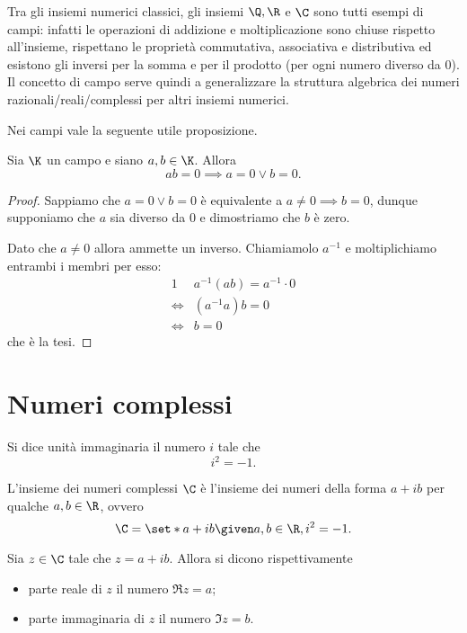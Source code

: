 Tra gli insiemi numerici classici, gli insiemi $\Q, \R$ e $\C$ sono tutti esempi di campi: infatti le operazioni di addizione e moltiplicazione sono chiuse rispetto all'insieme, rispettano le proprietà commutativa, associativa e distributiva ed esistono gli inversi per la somma e per il prodotto (per ogni numero diverso da $0$). Il concetto di campo serve quindi a generalizzare la struttura algebrica dei numeri razionali/reali/complessi per altri insiemi numerici.

Nei campi vale la seguente utile proposizione.
\begin{proposition}
     \label{annullamento_prodotto}
    Sia $\K$ un campo e siano $a, b \in \K$. Allora \[
        ab = 0 \implies a = 0 \lor b = 0.    
    \]
\end{proposition}
\begin{proof}
    Sappiamo che $a = 0 \lor b = 0$ è equivalente a $a \neq 0 \implies b = 0$, dunque supponiamo che $a$ sia diverso da $0$ e dimostriamo che $b$ è zero.

    Dato che $a \neq 0$ allora ammette un inverso. Chiamiamolo $a^{-1}$ e moltiplichiamo entrambi i membri per esso:
    \begin{alignat*}
        {1}
        &a^{-1}(ab) = a^{-1} \cdot 0\\
        \iff &(a^{-1}a)b = 0 \\
        \iff &b = 0
    \end{alignat*}
    che è la tesi.
\end{proof}

\section{Numeri complessi}

\begin{definition}
    Si dice unità immaginaria il numero $i$ tale che \[
        i^2 = -1.    
    \]
\end{definition}

\begin{definition}
    L'insieme dei numeri complessi $\C$ è l'insieme dei numeri della forma $a+ib$ per qualche $a, b \in \R$, ovvero \[
        \C = \set*{ a + ib \given a, b \in \R, i^2 = -1}.  
    \]
\end{definition}

\begin{definition}
    Sia $z \in \C$ tale che $z = a + ib$. Allora si dicono rispettivamente \begin{itemize}
        \item parte reale di $z$ il numero $\Re z = a$;
        \item parte immaginaria di $z$ il numero $\Im z = b$.
    \end{itemize}
\end{definition}

